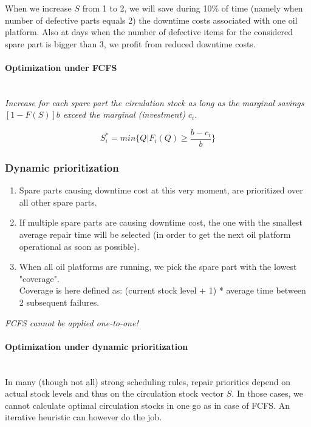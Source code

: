 When we increase $S$ from 1 to 2, we will save during 10\% of time (namely
when number of defective parts equals 2) the downtime costs associated
with one oil platform. Also at days when the number of defective items for
the considered spare part is bigger than 3, we profit from reduced
downtime costs.

\paragraph{Optimization under FCFS}\mbox{}\\
\emph{Increase for each spare part the circulation stock as long as the
	marginal savings $[1-F(S)] b$ exceed the marginal (investment)
	$c_i$.}

\begin{equation}
S_i^* = min\{Q | F_i(Q) \ge \frac{b-c_i}{b}\}
\end{equation}

\subsubsection{Dynamic prioritization}

\begin{enumerate}
	\tightlist
	\item Spare parts causing downtime cost at this very moment, are prioritized
	over all other spare parts.
	\item If multiple spare parts are causing downtime cost, the one with the
	smallest average repair time will be selected (in order to get the next oil
	platform operational as soon as possible).
	\item When all oil platforms are running, we pick the spare part with the
	lowest "coverage".\\
	Coverage is here defined as: (current stock level +
	1) * average time between 2 subsequent failures.
\end{enumerate}

\emph{FCFS cannot be applied one-to-one!}

\paragraph{Optimization under dynamic prioritization}\mbox{}\\
In many (though not all) strong scheduling rules, repair priorities depend
on actual stock levels and thus on the circulation stock vector $S$. In
those cases, we cannot calculate optimal circulation stocks in one go as
in case of FCFS. An iterative heuristic can however do the job.

